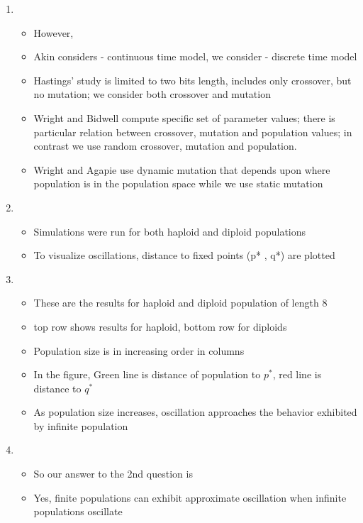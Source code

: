 \documentclass{article}
\begin{document}
\begin{enumerate}
    
\item
  \begin{itemize}
  \item  However,
  \item Akin considers - continuous time model, we consider -
    discrete time model
   \item Hastings' study is limited to two bits length, includes only
     crossover, but no mutation; we consider both crossover and mutation
  \item Wright and Bidwell compute specific set of parameter values; there is particular relation between crossover, mutation and population values; in contrast we use random crossover, mutation and population.
  \item Wright and Agapie use dynamic mutation that depends upon
    where population is in the population space while we use static
    mutation
  \end{itemize}

\item
  \begin{itemize}
  \item Simulations were run for both haploid and diploid populations
  \item To visualize oscillations, distance to fixed points (p* , q*) are plotted
  \end{itemize}
    
\item
  \begin{itemize}
  \item These are the results for haploid and diploid population of
    length 8
   \item top row shows results for haploid, bottom row for diploids
  \item Population size is in increasing order in columns
  \item In the figure, Green line is distance of population to $p^\ast$, red line is distance to $q^\ast$
  \item As population size increases, oscillation approaches the
    behavior exhibited by infinite population
  \end{itemize}
    
    
\item
  \begin{itemize}
  \item So our answer to the 2nd question is
   \item Yes, finite populations can exhibit approximate oscillation when infinite populations oscillate
  \end{itemize}
  

\end{enumerate}
\end{document}
